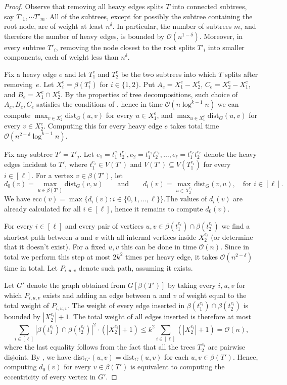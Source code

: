 \documentclass[11pt,a4paper]{article}
\newcommand{\Oh}{\mathcal{O}}
\newcommand{\dist}{\mathrm{dist}}
\newcommand{\ecc}{\mathrm{ecc}}
\renewcommand{\leq}{\leqslant}
\renewcommand{\setminus}{-}
\begin{document}
\begin{proof}
Observe that
removing all heavy edges splits $T$ into connected subtrees, say $T'_1, \cdots T'_m$. All of the subtrees, except for possibly the subtree containing the root node, are of weight at least $n^\delta$. In particular, the number of subtrees $m$, and therefore the number of heavy edges, is  bounded by $\Oh(n^{1 - \delta})$. Moreover, in every subtree $T'_i$, removing the node closest to the root splits $T'_i$ into smaller components, each of weight less than $n^\delta$.

Fix a heavy edge $e$ and let $T^e_1$ and $T^e_2$ be the two subtrees into which $T$ splits after removing~$e$. Let $X^e_i = \beta(T^e_i)$ for $i \in \{1, 2\}$. Put $A_e = X^e_1 \setminus X^e_2$, $C_e = X^e_2 \setminus X^e_1$, and $B_e = X^e_1 \cap X^e_2$. By the properties of tree decompositions, such choice of $A_e, B_e, C_e$ satisfies the conditions of , hence in time $\Oh(n \log^{k - 1} n)$ we can compute $\max_{v \in X^e_2} \dist_G(u,v)$ for every $u \in X^e_1$, and $\max_{u \in X^e_1} \dist_G(u,v)$ for every $v \in X^e_2$. Computing this for every heavy edge $e$ takes total time $\Oh(n^{2 - \delta} \log^{k - 1} n)$.

Fix any subtree $T'=T'_j$. Let $e_1 = t^{e_1}_1t^{e_1}_2, e_2 = t^{e_2}_1 t^{e_2}_2, \dots, e_\ell = t^{e_\ell}_1 t^{e_\ell}_2$ denote the heavy edges incident to $T'$, where $t^{e_i}_1 \in V(T')$ and $V(T') \subseteq V(T_1^{e_i})$ for every $i \in [\ell]$.
For a vertex $v \in \beta(T')$, let
$$d_0(v) = \max_{u \in \beta(T')} \dist_G(v, u)\qquad\textrm{and}\qquad d_i(v) = \max_{u \in X_2^{e_i}}\dist_G(v,u),\quad\textrm{for } i \in [\ell].$$ We have $\ecc(v) = \max \{ d_i(v)\colon i\in \{0,1,\ldots,\ell\}\}$.The values of $d_i(v)$ are already calculated for all $i\in [\ell]$, hence it remains to compute $d_0(v)$.

For every $i \in [\ell]$ and every pair of vertices $u, v \in \beta(t^{e_i}_1) \cap \beta(t^{e_i}_2)$ we find a shortest path between $u$ and $v$ with all internal vertices inside $X^{e_i}_2$ (or determine that it doesn't exist). For a fixed $u, v$ this can be done in time $\Oh(n)$. Since in total we perform this step at most $2k^2$ times per heavy edge, it takes $\Oh(n^{2 - \delta})$ time in total. Let $P_{i, u, v}$ denote such path, assuming it exists.

Let $G'$ denote the graph obtained from $G[\beta(T')]$ by taking every $i, u, v$ for which $P_{i, u, v}$ exists and adding an edge between $u$ and $v$ of weight equal to the total weight of $P_{i, u, v}$.
The weight of every edge inserted in $\beta(t^{e_i}_1) \cap \beta(t^{e_i}_2)$ is bounded by $|X^{e_i}_2|+1$. The total weight of all edges inserted is therefore at most
$$
\sum_{i \in [\ell]} |\beta(t^{e_i}_1) \cap \beta(t^{e_i}_2)|^2 \cdot (|X^{e_i}_2|+1) \leq
k^2 \sum_{i \in [\ell]} (|X^{e_i}_2|+1) = \Oh(n),
$$
where the last equality follows from the fact that all the trees $T^{e_i}_2$ are pairwise disjoint.
By , we have $\dist_{G'}(u, v) = \dist_G(u, v)$ for each $u, v \in \beta(T')$. Hence, computing $d_0(v)$ for every $v \in \beta(T')$ is equivalent to computing the eccentricity of every vertex in $G'$.


\end{proof}
\end{document}
